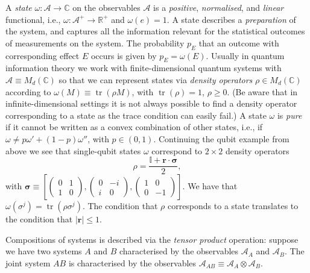 \documentclass[11pt]{amsart}
\DeclareMathOperator{\tr}{tr}
\theoremstyle{plain}%
\theoremstyle{definition}
\theoremstyle{remark}
\begin{document}
A \emph{state} $\omega:\mathcal{A}\rightarrow \mathbb{C}$ on the observables $\mathcal{A}$ is a \emph{positive}, \emph{normalised}, and \emph{linear} functional, i.e., $\omega:\mathcal{A}^+\rightarrow \mathbb{R}^+$ and $\omega(e) = 1$. A state describes a \emph{preparation} of the system, and captures all the information relevant for the statistical outcomes of measurements on the system. The probability $p_E$ that an outcome with corresponding effect $E$ occurs is given by $p_E = \omega(E)$. Usually in quantum information theory we work with finite-dimensional quantum systems with $\mathcal{A}\equiv M_d(\mathbb{C})$ so that we can represent states via \emph{density operators} $\rho\in M_d(\mathbb{C})$ according to $\omega(M) \equiv \tr(\rho M)$, with $\tr(\rho) = 1$, $\rho \ge 0$. (Be aware that in infinite-dimensional settings it is not always possible to find a density operator corresponding to a state as the trace condition can easily fail.) A state $\omega$ is \emph{pure} if it cannot be written as a convex combination of other states, i.e., if $\omega \not= p \omega' + (1-p) \omega''$, with $p\in (0,1)$. Continuing the qubit example from above we see that single-qubit states $\omega$ correspond to $2\times 2$ density operators 
\begin{equation}
	\rho = \frac{\mathbb{I} + \mathbf{r}\cdot \boldsymbol{\sigma}}{2},  
\end{equation}  
with $\boldsymbol{\sigma} \equiv \left[\left(\begin{smallmatrix} 0 & 1 \\ 1 & 0\end{smallmatrix}\right), \left(\begin{smallmatrix} 0 & -i \\ i & 0\end{smallmatrix}\right), \left(\begin{smallmatrix} 1 & 0 \\ 0 & -1\end{smallmatrix}\right)\right]$. We have that $\omega(\sigma^j) = \tr(\rho \sigma^j)$. The condition that $\rho$ corresponds to a state translates to the condition that $|\mathbf{r}| \le 1$.

Compositions of systems is described via the \emph{tensor product} operation: suppose we have two systems $A$ and $B$ characterised by the observables $\mathcal{A}_A$ and $\mathcal{A}_B$. The joint system $AB$ is characterised by the observables $\mathcal{A}_{AB} \equiv \mathcal{A}_A\otimes \mathcal{A}_B$.
\end{document}
